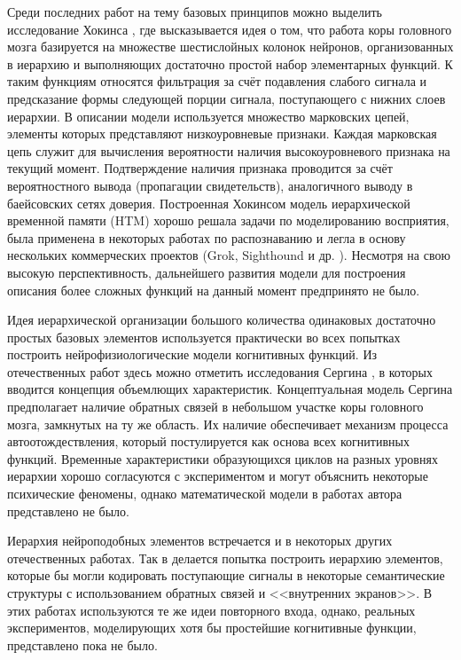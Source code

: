 Среди последних работ на тему базовых принципов можно выделить исследование Хокинса \cite{Hawkins2009}, где высказывается идея о том, что работа коры головного мозга базируется на множестве шестислойных колонок нейронов, организованных в иерархию и выполняющих достаточно простой набор элементарных функций. К таким функциям относятся фильтрация за счёт подавления слабого сигнала и предсказание формы следующей порции сигнала, поступающего с нижних слоев иерархии. В описании модели используется множество марковских цепей, элементы которых представляют низкоуровневые признаки. Каждая марковская цепь служит для вычисления вероятности наличия высокоуровневого признака на текущий момент. Подтверждение наличия признака проводится за счёт вероятностного вывода (пропагации свидетельств), аналогичного выводу в баейсовских сетях доверия. Построенная Хокинсом модель иерархической временной памяти (HTM) хорошо решала задачи по моделированию восприятия, была применена в некоторых работах по распознаванию \cite{Bolotova2011} и легла в основу нескольких коммерческих проектов (Grok, Sighthound и др. \cite{NUM2014}). Несмотря на свою высокую перспективность, дальнейшего развития модели для построения описания более сложных функций на данный момент предпринято не было.

Идея иерархической организации большого количества одинаковых достаточно простых базовых элементов используется практически во всех попытках построить нейрофизиологические модели когнитивных функций. Из отечественных работ здесь можно отметить исследования Сергина \cite{Sergin2011}, в которых вводится концепция объемлющих характеристик. Концептуальная модель Сергина предполагает наличие обратных связей в небольшом участке коры головного мозга, замкнутых на ту же область. Их наличие обеспечивает механизм процесса автоотождествления, который постулируется как основа всех когнитивных функций. Временные характеристики образующихся циклов на разных уровнях иерархии хорошо согласуются с экспериментом и могут объяснить некоторые психические феномены, однако математической модели в работах автора представлено не было.

Иерархия нейроподобных элементов встречается и в некоторых других отечественных работах. Так в \cite{Vartanov2011,Chernavsky2012} делается попытка построить иерархию элементов, которые бы могли кодировать поступающие сигналы в некоторые семантические структуры с использованием обратных связей и <<внутренних экранов>>. В этих работах используются те же идеи повторного входа, однако, реальных экспериментов, моделирующих хотя бы простейшие когнитивные функции, представлено пока не было.

